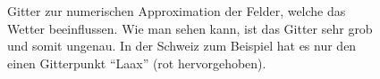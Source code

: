 \begin{figure}
	\centering
{}
	\caption{Gitter zur numerischen Approximation der Felder, welche das Wetter beeinflussen.
		Wie man sehen kann, ist das Gitter sehr grob und somit ungenau.
		In der Schweiz zum Beispiel hat es nur den einen Gitterpunkt ``Laax'' ({\color{darkred}rot} hervorgehoben). 
		}
	\label{bild:karteEuropa}
\end{figure}

